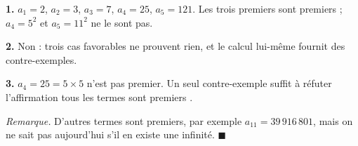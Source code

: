 \textbf{1.} $a_1 = 2$, $a_2 = 3$, $a_3 = 7$, $a_4 = 25$, $a_5 = 121$. Les
trois premiers sont premiers ; $a_4 = 5^2$ et $a_5 = 11^2$ ne le sont pas.

\textbf{2.} Non : trois cas favorables ne prouvent rien, et le calcul
lui-même fournit des contre-exemples.

\textbf{3.} $a_4 = 25 = 5 \times 5$ n'est pas premier. Un seul contre-exemple
suffit à réfuter l'affirmation \og tous les termes sont premiers \fg.

\emph{Remarque.} D'autres termes sont premiers, par exemple
$a_{11} = 39\,916\,801$, mais on ne sait pas aujourd'hui s'il en existe une
infinité.
\hfill $\blacksquare$
